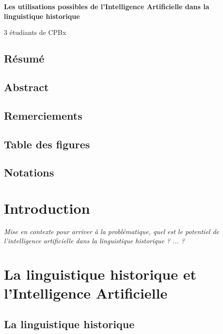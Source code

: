 \documentclass[12pt, french]{report}
\begin{document}
\pagestyle{fancy}
\fancyhead{}
\fancyhead[R]{\nouppercase{\hfill\leftmark}\\}
\fancyhead[L]{\nouppercase{\rightmark\hfill}}
\begin{titlepage}
    \centering
    \vspace*{\fill}

    \huge\bfseries
    Les utilisations possibles de l'Intelligence Artificielle dans la linguistique historique
    
    \vspace*{1.5cm}
    \large 3 étudiants de CPBx
    
    \vspace*{\fill}
\end{titlepage}

\null
\newpage %
\section{Résumé}
\section{Abstract}
\section{Remerciements}

\tableofcontents
\section{Table des figures}
\section{Notations}

\chapter{Introduction}
\textit{Mise en contexte pour arriver à la problématique, quel est le potentiel de l'intelligence artificielle dans la linguistique historique ? ... ?}

\chapter{La linguistique historique et l'Intelligence Artificielle}
\section{La linguistique historique}
\end{document}
